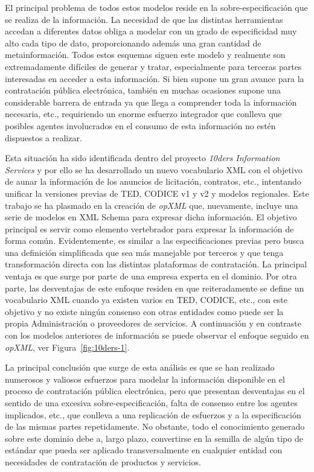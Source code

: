 El principal problema de todos estos modelos reside en la sobre-especificación
que se realiza de la información. La necesidad de que las distintas herramientas accedan
a diferentes datos obliga a modelar con un grado de especificidad muy alto cada tipo de dato, proporcionando
además una gran cantidad de metainformación. Todos estos esquemas siguen este modelo y realmente
son extremadamente difíciles de generar y tratar, especialmente para terceras partes interesadas
en acceder a esta información. Si bien supone un gran avance para la contratación pública electrónica, 
también en muchas ocasiones supone una considerable barrera de entrada ya que llega a comprender toda la información
necesaria, etc., requiriendo un enorme esfuerzo integrador que conlleva que posibles agentes involucrados
en el consumo de esta información no estén dispuestos a realizar. 

Esta situación ha sido identificada dentro del proyecto \textit{\gls{10ders} Information Services} y por ello
se ha desarrollado un nuevo vocabulario \gls{XML} con el objetivo de aunar la información de los anuncios de licitación,
contratos, etc., intentando unificar la versiones previas de \gls{TED}, \gls{CODICE} v1 y v2 y modelos
regionales. Este trabajo se ha plasmado en la creación de \textit{\gls{opXML}} que, nuevamente, incluye
una serie de modelos en \gls{XML Schema} para expresar dicha información. El objetivo principal
es servir como elemento vertebrador para expresar la información de forma común. Evidentemente,
es similar a las especificaciones previas pero busca una definición simplificada que sea más manejable
por terceros y que tenga transformación directa con las distintas plataformas de contratación. La principal ventaja
es que surge por parte de una empresa experta en el dominio. Por otra parte, las desventajas
de este enfoque residen en que reiteradamente se define un vocabulario XML cuando ya existen varios en \gls{TED}, CODICE, etc., 
con este objetivo y no existe ningún consenso con otras entidades como puede ser la propia Administración o proveedores
de servicios.  A continuación y en contraste con los modelos anteriores de información se puede observar el 
enfoque seguido en \textit{opXML}, ver Figura~\ref{fig:10ders-1}. 

\newpage
La principal conclusión que surge de esta análisis es que se han realizado numerosos y valiosos esfuerzos
para modelar la información disponible en el proceso de contratación pública electrónica, pero
que presentan desventajas en el sentido de una excesiva sobre-especificación, falta de consenso
entre los agentes implicados, etc., que conlleva a una replicación de esfuerzos y a la especificación
de las mismas partes repetidamente. No obstante, todo el conocimiento generado sobre este dominio
debe a, largo plazo, convertirse en la semilla de algún tipo de estándar que pueda ser aplicado
transversalmente en cualquier entidad con necesidades de contratación de productos y servicios.


